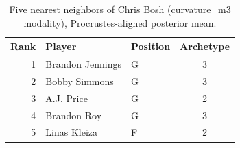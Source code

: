 \begin{table}[htbp]
  \centering\small
  \begin{tabular}{rllc}
    \toprule
    Rank & Player & Position & Archetype \\
    \midrule
    1 & Brandon Jennings & G & 3 \\
    2 & Bobby Simmons & G & 3 \\
    3 & A.J. Price & G & 2 \\
    4 & Brandon Roy & G & 3 \\
    5 & Linas Kleiza & F & 2 \\
    \bottomrule
  \end{tabular}
  \caption{Five nearest neighbors of Chris Bosh (curvature_m3 modality), Procrustes-aligned posterior mean.}
  \label{tab:Chris_Bosh_neighbors_curvature_m3}
\end{table}

